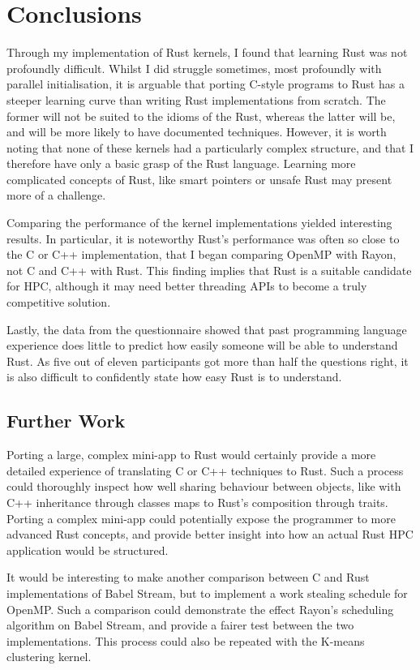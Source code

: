 \chapter{Conclusions}
Through my implementation of Rust kernels, I found that learning Rust was not profoundly difficult. Whilst I did struggle sometimes, most profoundly with parallel initialisation, it is arguable that porting C-style programs to Rust has a steeper learning curve than writing Rust implementations from scratch. The former will not be suited to the idioms of the Rust, whereas the latter will be, and will be more likely to have documented techniques. However, it is  worth noting that none of these kernels had a particularly complex structure, and that I therefore have only a basic grasp of the Rust language. Learning more complicated concepts of Rust, like smart pointers or unsafe Rust may present more of a challenge.

Comparing the performance of the kernel implementations yielded interesting results. In particular, it is noteworthy Rust's performance was often so close to the C or C++ implementation, that I began comparing OpenMP with Rayon, not C and C++ with Rust. This finding implies that Rust is a suitable candidate for HPC, although it may need better threading APIs to become a truly competitive solution.

Lastly, the data from the questionnaire showed that past programming language experience does little to predict how easily someone will be able to understand Rust. As five out of eleven participants got more than half the questions right, it is also difficult to confidently state how easy Rust is to understand. 

\section{Further Work}\label{sec:furth}
Porting a large, complex mini-app to Rust would certainly provide a more detailed experience of translating C or C++ techniques to Rust. Such a process could thoroughly inspect how well sharing behaviour between objects, like with C++ inheritance through classes maps to Rust's composition through traits. Porting a complex mini-app could potentially expose the programmer to more advanced Rust concepts, and provide better insight into how an actual Rust HPC application would be structured.

It would be interesting to make another comparison between C and Rust implementations of Babel Stream, but to implement a work stealing schedule for OpenMP\@. Such a comparison could demonstrate the effect Rayon's scheduling algorithm on Babel Stream, and provide a fairer test between the two implementations. This process could also be repeated with the K-means clustering kernel. 


